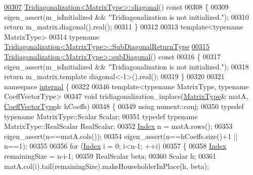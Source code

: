 \begin{DoxyCode}
\hyperlink{group___eigenvalues___module_a0b7ff4860aa6f7c0761b1059c012fd8e}{00307} \hyperlink{group___eigenvalues___module_a0b7ff4860aa6f7c0761b1059c012fd8e}{Tridiagonalization<MatrixType>::diagonal}()\textcolor{keyword}{ const}
00308 \textcolor{keyword}{}\{
00309   eigen\_assert(m\_isInitialized && \textcolor{stringliteral}{"Tridiagonalization is not initialized."});
00310   \textcolor{keywordflow}{return} m\_matrix.diagonal().real();
00311 \}
00312 
00313 \textcolor{keyword}{template}<\textcolor{keyword}{typename} MatrixType>
00314 \textcolor{keyword}{typename} \hyperlink{class_eigen_1_1internal_1_1_tensor_lazy_evaluator_writable}{Tridiagonalization<MatrixType>::SubDiagonalReturnType}
\hyperlink{group___eigenvalues___module_ac423dbb91157c159bdcb4b5a8371232e}{00315} \hyperlink{group___eigenvalues___module_ac423dbb91157c159bdcb4b5a8371232e}{Tridiagonalization<MatrixType>::subDiagonal}()\textcolor{keyword}{ const}
00316 \textcolor{keyword}{}\{
00317   eigen\_assert(m\_isInitialized && \textcolor{stringliteral}{"Tridiagonalization is not initialized."});
00318   \textcolor{keywordflow}{return} m\_matrix.template diagonal<-1>().real();
00319 \}
00320 
00321 \textcolor{keyword}{namespace }\hyperlink{namespaceinternal}{internal} \{
00322 
00346 \textcolor{keyword}{template}<\textcolor{keyword}{typename} MatrixType, \textcolor{keyword}{typename} CoeffVectorType>
00347 \textcolor{keywordtype}{void} tridiagonalization\_inplace(\hyperlink{group___eigenvalues___module_add0f4b2216d0ea8ee0f7d8525deaf0a9}{MatrixType}& matA, \hyperlink{group___core___module}{CoeffVectorType}& hCoeffs)
00348 \{
00349   \textcolor{keyword}{using} numext::conj;
00350   \textcolor{keyword}{typedef} \textcolor{keyword}{typename} MatrixType::Scalar Scalar;
00351   \textcolor{keyword}{typedef} \textcolor{keyword}{typename} MatrixType::RealScalar RealScalar;
00352   \hyperlink{group___eigenvalues___module_a7bd1f9fccec1e93b77a2214b2d30aae9}{Index} n = matA.rows();
00353   eigen\_assert(n==matA.cols());
00354   eigen\_assert(n==hCoeffs.size()+1 || n==1);
00355   
00356   \textcolor{keywordflow}{for} (\hyperlink{group___eigenvalues___module_a7bd1f9fccec1e93b77a2214b2d30aae9}{Index} i = 0; i<n-1; ++i)
00357   \{
00358     \hyperlink{group___eigenvalues___module_a7bd1f9fccec1e93b77a2214b2d30aae9}{Index} remainingSize = n-i-1;
00359     RealScalar beta;
00360     Scalar h;
00361     matA.col(i).tail(remainingSize).makeHouseholderInPlace(h, beta);

\end{DoxyCode}
